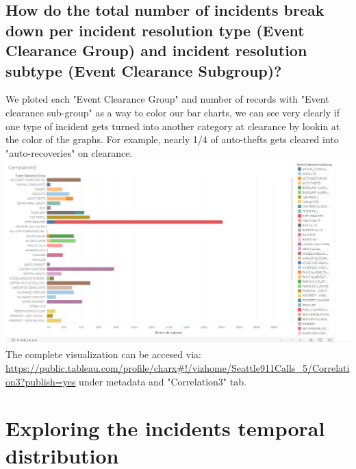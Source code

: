 \documentclass{article}
\begin{document}
    \subsection{How do the total number of incidents break down per incident resolution	 type (Event	Clearance Group) and incident resolution subtype (Event	Clearance Subgroup)?}
    We ploted each "Event Clearance Group" and number of records with "Event clearance sub-group" as a way to color our bar charts, we can see very clearly if one type of incident gets turned into another category at clearance by lookin at the color of the graphs. For example, nearly 1/4 of auto-thefts gets cleared into "auto-recoveries" on clearance.
    \\
    \includegraphics[width=\textwidth]{VisualAnalytics/Assignment2/images/Correlation3.PNG}
    \\
    The complete visualization can be accesed via: \url{https://public.tableau.com/profile/charx#!/vizhome/Seattle911Calls_5/Correlation3?publish=yes} under metadata and "Correlation3" tab.
    \\

    \section{Exploring the incidents temporal distribution}
    
    
\end{document}

